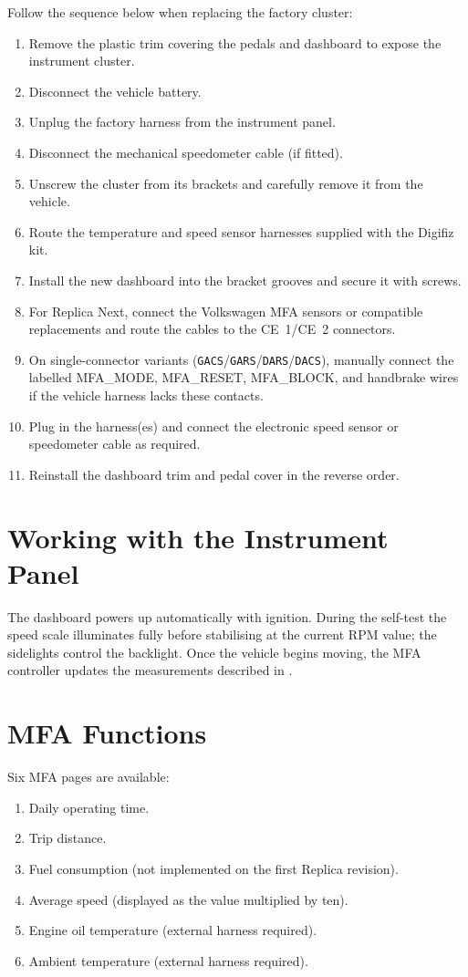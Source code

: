 Follow the sequence below when replacing the factory cluster:
\begin{enumerate}
    \item Remove the plastic trim covering the pedals and dashboard to expose the instrument cluster.
    \item Disconnect the vehicle battery.
    \item Unplug the factory harness from the instrument panel.
    \item Disconnect the mechanical speedometer cable (if fitted).
    \item Unscrew the cluster from its brackets and carefully remove it from the vehicle.
    \item Route the temperature and speed sensor harnesses supplied with the Digifiz kit.
    \item Install the new dashboard into the bracket grooves and secure it with screws.
    \item For Replica Next, connect the Volkswagen MFA sensors or compatible replacements and route the cables to the CE~1/CE~2 connectors.
    \item On single-connector variants (\texttt{GACS}/\texttt{GARS}/\texttt{DARS}/\texttt{DACS}), manually connect the labelled MFA\_MODE, MFA\_RESET, MFA\_BLOCK, and handbrake wires if the vehicle harness lacks these contacts.
    \item Plug in the harness(es) and connect the electronic speed sensor or speedometer cable as required.
    \item Reinstall the dashboard trim and pedal cover in the reverse order.
\end{enumerate}

\section{Working with the Instrument Panel}

The dashboard powers up automatically with ignition.
During the self-test the speed scale illuminates fully before stabilising at the current RPM value; the sidelights control the backlight.
Once the vehicle begins moving, the MFA controller updates the measurements described in .

\section{MFA Functions}

Six MFA pages are available:
\begin{enumerate}
    \item Daily operating time.
    \item Trip distance.
    \item Fuel consumption (not implemented on the first Replica revision).
    \item Average speed (displayed as the value multiplied by ten).
    \item Engine oil temperature (external harness required).
    \item Ambient temperature (external harness required).
\end{enumerate}

